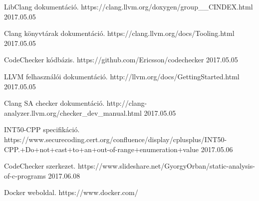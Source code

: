 \documentclass[a4paper,12pt]{report}
\begin{document}
\begin{thebibliography}{xx}
 LibClang dokumentáció. https://clang.llvm.org/doxygen/group\_\_CINDEX.html 2017.05.05

 Clang könyvtárak dokumentáció. https://clang.llvm.org/docs/Tooling.html 2017.05.05

 CodeChecker kódbázis. https://github.com/Ericsson/codechecker 2017.05.05

 LLVM felhasználói dokumentáció. http://llvm.org/docs/GettingStarted.html 2017.05.05

 Clang SA checker dokumentáció. http://clang-analyzer.llvm.org/checker\_dev\_manual.html 2017.05.05

 INT50-CPP specifikáció. https://www.securecoding.cert.org/confluence/display/cplusplus/INT50-CPP.+Do+not+cast+to+an+out-of-range+enumeration+value 2017.05.06

 CodeChecker szerkezet. https://www.slideshare.net/GyorgyOrban/static-analysis-of-c-programs 2017.06.08

 Docker weboldal. https://www.docker.com/

\end{thebibliography}
\end{document}
